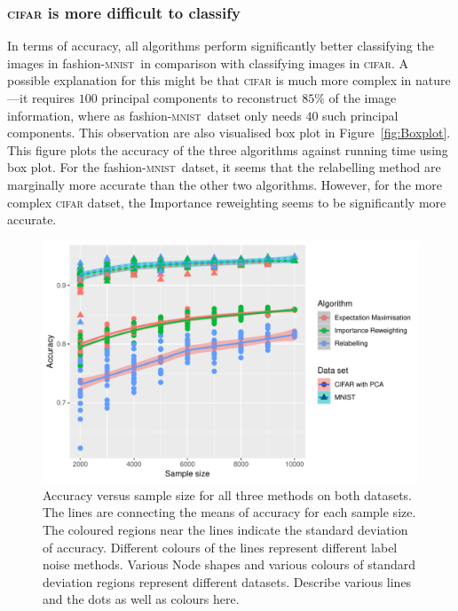 \documentclass[12pt]{article} %
\newcommand{\mnist}{fashion-\textsc{mnist}\ }
\begin{document}
\subsubsection{\textsc{cifar} is more difficult to classify}
In terms of accuracy, all algorithms perform significantly better classifying the images in \mnist in comparison with classifying images in \textsc{cifar}.
A possible explanation for this might be that \textsc{cifar} is much more complex in nature---it requires $100$ principal components to reconstruct $85\%$ of the image information, where as \mnist datset only needs $40$ such principal components.
This observation are also visualised box plot in Figure~\ref{fig:Boxplot}. This figure plots the accuracy of the three algorithms against running time using box plot. For the \mnist  datset, it seems that the relabelling method are marginally more accurate than the other two algorithms. However, for the  more complex \textsc{cifar} datset, the Importance reweighting seems to be significantly more accurate.
\begin{figure}
	\centering
    \includegraphics[scale=.8]{accuracy}%
	\caption{Accuracy versus sample size for all three methods on both datasets. The lines are connecting the means of accuracy for each sample size. The coloured regions near the lines indicate the standard deviation of accuracy. Different colours of the lines represent different label noise methods. Various Node shapes and various colours of standard deviation regions represent different datasets. {\color{red}Describe various lines and the dots as well as colours here. }
}
	\label{fig:acc}
\end{figure}
\end{document}
